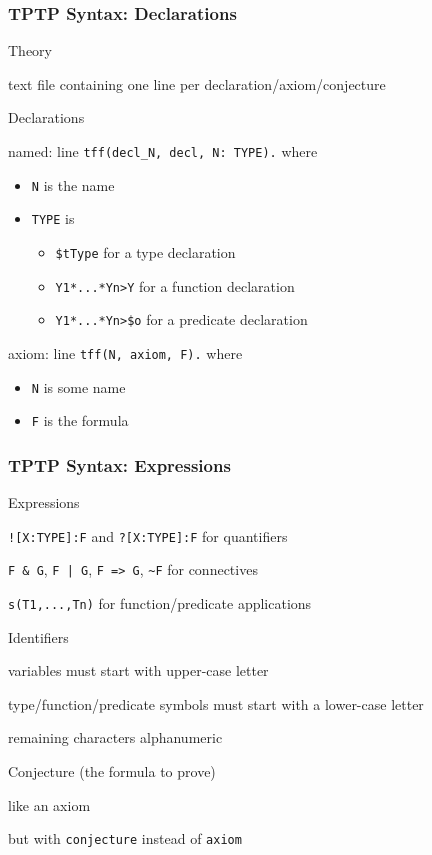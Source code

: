 \begin{frame}[fragile]\frametitle{TPTP Syntax: Declarations}
\begin{blockitems}{Theory}
\item text file containing one line per declaration/axiom/conjecture
\end{blockitems}

\begin{blockitems}{Declarations}
\item named: line \lstinline|tff(decl_N, decl, N: TYPE).| where
\begin{itemize}
\item \lstinline|N| is the name
\item \lstinline|TYPE| is
 \begin{itemize}
 \item \lstinline[mathescape=false]|$tType| for a type declaration
 \item \lstinline|Y1*...*Yn>Y| for a function declaration
 \item \lstinline[mathescape=false]|Y1*...*Yn>$o| for a predicate declaration
 \end{itemize}
\end{itemize}
\item axiom: line \lstinline|tff(N, axiom, F).| where
\begin{itemize}
\item \lstinline|N| is some name
\item \lstinline|F| is the formula
\end{itemize}
\end{blockitems}
\end{frame}

\begin{frame}[fragile]\frametitle{TPTP Syntax: Expressions}
\begin{blockitems}{Expressions}
\item \lstinline|![X:TYPE]:F| and \lstinline|?[X:TYPE]:F| for quantifiers
\item \lstinline!F & G!, \lstinline!F | G!, \lstinline!F => G!, \lstinline!~F! for connectives
\item \lstinline|s(T1,...,Tn)| for function/predicate applications
\end{blockitems}

\begin{blockitems}{Identifiers}
\item variables must start with upper-case letter
\item type/function/predicate symbols must start with a lower-case letter
\item remaining characters alphanumeric
\end{blockitems}

\begin{blockitems}{Conjecture (the formula to prove)}
\item like an axiom
\item but with \lstinline|conjecture| instead of \lstinline|axiom|
\end{blockitems}
\end{frame}


